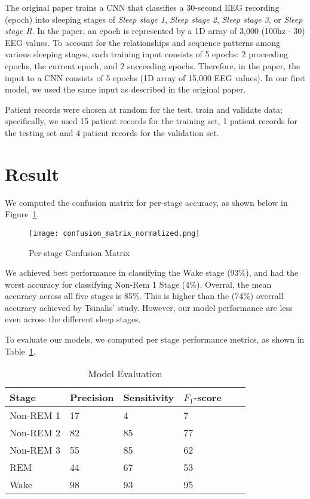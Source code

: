 \documentclass{amia}
\begin{document}
The original paper trains a CNN that classifies a 30-second EEG recording (epoch) into sleeping stages of \textit{Sleep stage 1}, \textit{Sleep stage 2}, \textit{Sleep stage 3}, or \textit{Sleep stage R}. In the paper, an epoch is represented by a 1D array of 3,000 (100hz $\cdot$ 30) EEG values. To account for the relationships and sequence patterns among various sleeping stages, each training input consists of 5 epochs: 2 proceeding epochs, the current epoch, and 2 succeeding epochs. Therefore, in the paper, the input to a CNN consists of 5 epochs (1D array of 15,000 EEG values). In our first model, we used the same input as described in the original paper.

Patient records were chosen at random for the test, train and validate data; specifically, we used 15 patient records for the training set, 1 patient records for the testing set and 4 patient records for the validation set. 

\section*{Result}


We computed the confusion matrix for per-stage accuracy, as shown below in Figure~\ref{fig:figure1}.

\begin{figure}[htb]
\begin{center}
\texttt{[image: confusion\_matrix\_normalized.png]}
\end{center}
\caption{Per-stage Confusion Matrix}
\label{fig:figure1}
\end{figure}

We achieved best performance in classifying the Wake stage (93\%), and had the worst accuracy for classifying Non-Rem 1 Stage (4\%). Overral, the mean accuracy across all five stages is 85\%. This is higher than the (74\%) overrall accuracy achieved by Tsinalis' study. However, our model performance are less even across the different sleep stages. 

To evaluate our models, we computed per stage performance metrics, as shown in Table~\ref{tab:c}. 

\begin{table}[h]
\centering
\caption{Model Evaluation}\label{tab:c}
\begin{tabular}{| l | l | l | l | l | l |}
\hline
Stage & Precision & Sensitivity & $F_{1}$-score \\ \hline
Non-REM 1 & 17 & 4 & 7 \\ \hline
Non-REM 2 & 82 & 85 & 77 \\ \hline
Non-REM 3 & 55 & 85 & 62 \\ \hline
REM & 44 & 67 & 53 \\ \hline
Wake & 98 & 93 & 95 \\ \hline

\end{tabular}
\end{table}
\end{document}
